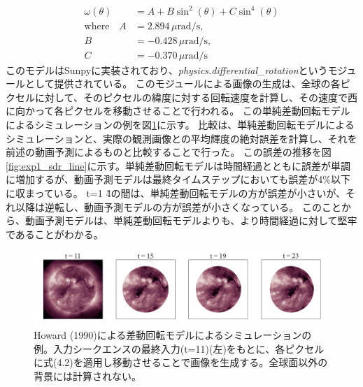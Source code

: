           \begin{align}
            \omega(\theta) &= A + B \sin^{2}(\theta) + C \sin^{4}(\theta) \\
            \text{where} \quad A &= 2.894 \, \mu\text{rad/s}, \\
            B &= -0.428 \, \mu\text{rad/s}, \\
            C &= -0.370 \, \mu\text{rad/s}
          \end{align}
          このモデルはSunpyに実装されており、\textit{physics.differential\_rotation}というモジュールとして提供されている。
          このモジュールによる画像の生成は、全球の各ピクセルに対して、そのピクセルの緯度に対する回転速度を計算し、その速度で西に向かって各ピクセルを移動させることで行われる。
          この単純差動回転モデルによるシミュレーションの例を図\ref{fig:exp1_sdr_example}に示す。
          比較は、単純差動回転モデルによるシミュレーションと、実際の観測画像との平均輝度の絶対誤差を計算し、それを前述の動画予測によるものと比較することで行った。
          この誤差の推移を図\ref{fig:exp1_sdr_line}に示す。単純差動回転モデルは時間経過とともに誤差が単調に増加するが、動画予測モデルは最終タイムステップにおいても誤差が4\%以下に収まっている。
          t=1 \~ 4の間は、単純差動回転モデルの方が誤差が小さいが、それ以降は逆転し、動画予測モデルの方が誤差が小さくなっている。
          このことから、動画予測モデルは、単純差動回転モデルよりも、より時間経過に対して堅牢であることがわかる。
          \begin{figure}[htbp]
            \centering
            \includegraphics[width=1.1\textwidth]{figures/exp1/sdr.png}
            \caption{Howard (1990)による差動回転モデルによるシミュレーションの例。入力シークエンスの最終入力(t=11)(左)をもとに、各ピクセルに式(4.2)を適用し移動させることで画像を生成する。全球面以外の背景には計算されない。}
            \label{fig:exp1_sdr_example}
          \end{figure}

